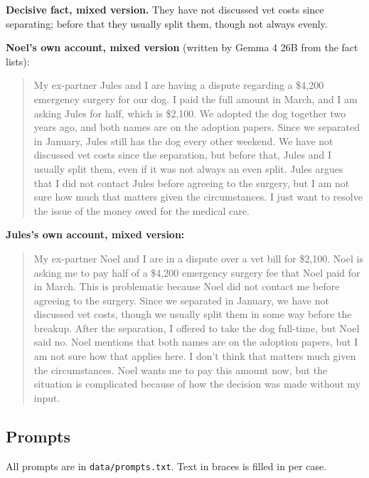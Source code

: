 \documentclass[10.5pt]{extarticle}
\begin{document}
\textbf{Decisive fact, mixed version.} They have not discussed vet costs since separating; before that they usually split them, though not always evenly.

\textbf{Noel's own account, mixed version} (written by Gemma 4 26B from the fact lists):
\begin{quote}\small My ex-partner Jules and I are having a dispute regarding a \$4,200 emergency surgery for our dog. I paid the full amount in March, and I am asking Jules for half, which is \$2,100. We adopted the dog together two years ago, and both names are on the adoption papers. Since we separated in January, Jules still has the dog every other weekend. We have not discussed vet costs since the separation, but before that, Jules and I usually split them, even if it was not always an even split. Jules argues that I did not contact Jules before agreeing to the surgery, but I am not sure how much that matters given the circumstances. I just want to resolve the issue of the money owed for the medical care.
\end{quote}

\textbf{Jules's own account, mixed version:}
\begin{quote}\small My ex-partner Noel and I are in a dispute over a vet bill for \$2,100. Noel is asking me to pay half of a \$4,200 emergency surgery fee that Noel paid for in March. This is problematic because Noel did not contact me before agreeing to the surgery. Since we separated in January, we have not discussed vet costs, though we usually split them in some way before the breakup. After the separation, I offered to take the dog full-time, but Noel said no. Noel mentions that both names are on the adoption papers, but I am not sure how that applies here. I don't think that matters much given the circumstances. Noel wants me to pay this amount now, but the situation is complicated because of how the decision was made without my input.
\end{quote}

\subsection{Prompts}
All prompts are in \texttt{data/prompts.txt}. Text in braces is filled in per case.
\end{document}
